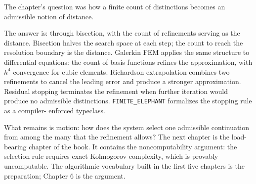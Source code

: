 \begin{bridge}

The chapter's question was how a finite count of distinctions becomes
an admissible notion of distance.

The answer is: through bisection, with the count of refinements
serving as the distance. Bisection halves the search space at each
step; the count to reach the resolution boundary is the distance.
Galerkin FEM applies the same structure to differential equations:
the count of basis functions refines the approximation, with $h^4$
convergence for cubic elements. Richardson extrapolation combines
two refinements to cancel the leading error and produce a stronger
approximation. Residual stopping terminates the refinement when
further iteration would produce no admissible distinctions.
\texttt{FINITE\_ELEPHANT} formalizes the stopping rule as a compiler-
enforced typeclass.

What remains is motion: how does the system select one admissible
continuation from among the many that the refinement allows? The
next chapter is the load-bearing chapter of the book. It contains
the noncomputability argument: the selection rule requires exact
Kolmogorov complexity, which is provably uncomputable. The
algorithmic vocabulary built in the first five chapters is the
preparation; Chapter 6 is the argument.

\end{bridge}

